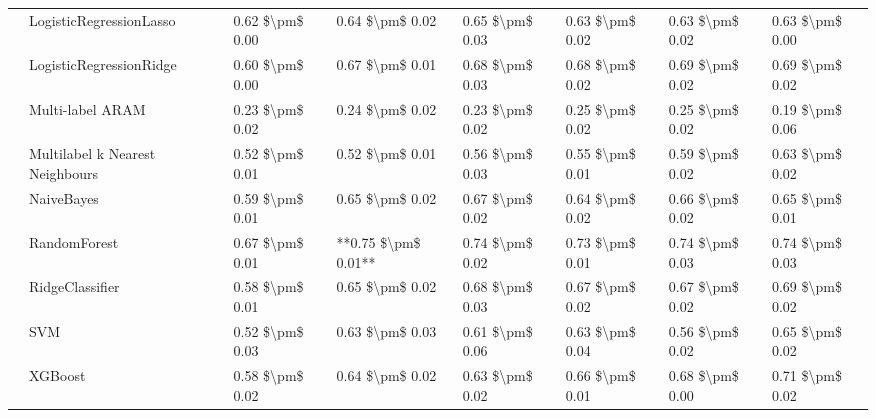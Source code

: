 \begin{tabular}{llllllll}
   & LogisticRegressionLasso &  0.62 \$\textbackslash pm\$ 0.00 &           0.64 \$\textbackslash pm\$ 0.02 &       0.65 \$\textbackslash pm\$ 0.03 &        0.63 \$\textbackslash pm\$ 0.02 &                         0.63 \$\textbackslash pm\$ 0.02 &      0.63 \$\textbackslash pm\$ 0.00 \\
   & LogisticRegressionRidge &  0.60 \$\textbackslash pm\$ 0.00 &           0.67 \$\textbackslash pm\$ 0.01 &       0.68 \$\textbackslash pm\$ 0.03 &        0.68 \$\textbackslash pm\$ 0.02 &                         0.69 \$\textbackslash pm\$ 0.02 &      0.69 \$\textbackslash pm\$ 0.02 \\
   & Multi-label ARAM &  0.23 \$\textbackslash pm\$ 0.02 &           0.24 \$\textbackslash pm\$ 0.02 &       0.23 \$\textbackslash pm\$ 0.02 &        0.25 \$\textbackslash pm\$ 0.02 &                         0.25 \$\textbackslash pm\$ 0.02 &      0.19 \$\textbackslash pm\$ 0.06 \\
   & Multilabel k Nearest Neighbours &  0.52 \$\textbackslash pm\$ 0.01 &           0.52 \$\textbackslash pm\$ 0.01 &       0.56 \$\textbackslash pm\$ 0.03 &        0.55 \$\textbackslash pm\$ 0.01 &                         0.59 \$\textbackslash pm\$ 0.02 &      0.63 \$\textbackslash pm\$ 0.02 \\
   & NaiveBayes &  0.59 \$\textbackslash pm\$ 0.01 &           0.65 \$\textbackslash pm\$ 0.02 &       0.67 \$\textbackslash pm\$ 0.02 &        0.64 \$\textbackslash pm\$ 0.02 &                         0.66 \$\textbackslash pm\$ 0.02 &      0.65 \$\textbackslash pm\$ 0.01 \\
   & RandomForest &  0.67 \$\textbackslash pm\$ 0.01 &       **0.75 \$\textbackslash pm\$ 0.01** &       0.74 \$\textbackslash pm\$ 0.02 &        0.73 \$\textbackslash pm\$ 0.01 &                         0.74 \$\textbackslash pm\$ 0.03 &      0.74 \$\textbackslash pm\$ 0.03 \\
   & RidgeClassifier &  0.58 \$\textbackslash pm\$ 0.01 &           0.65 \$\textbackslash pm\$ 0.02 &       0.68 \$\textbackslash pm\$ 0.03 &        0.67 \$\textbackslash pm\$ 0.02 &                         0.67 \$\textbackslash pm\$ 0.02 &      0.69 \$\textbackslash pm\$ 0.02 \\
   & SVM &  0.52 \$\textbackslash pm\$ 0.03 &           0.63 \$\textbackslash pm\$ 0.03 &       0.61 \$\textbackslash pm\$ 0.06 &        0.63 \$\textbackslash pm\$ 0.04 &                         0.56 \$\textbackslash pm\$ 0.02 &      0.65 \$\textbackslash pm\$ 0.02 \\
   & XGBoost &  0.58 \$\textbackslash pm\$ 0.02 &           0.64 \$\textbackslash pm\$ 0.02 &       0.63 \$\textbackslash pm\$ 0.02 &        0.66 \$\textbackslash pm\$ 0.01 &                         0.68 \$\textbackslash pm\$ 0.00 &      0.71 \$\textbackslash pm\$ 0.02 \\

\end{tabular}
